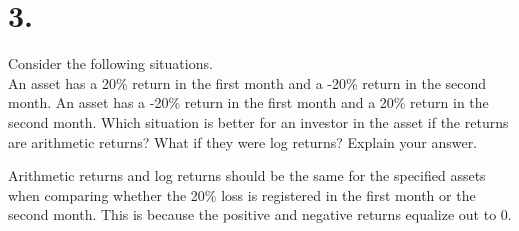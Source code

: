 \documentclass{article}
\begin{document}
\section*{3.}
{\Large 

Consider the following situations. \\
An asset has a 20\% return in the first month and a -20\% return in the second month.
An asset has a -20\% return in the first month and a 20\% return in the second month.
Which situation is better for an investor in the asset if the returns are arithmetic returns? What if they were log returns? Explain your answer.

Arithmetic returns and log returns should be the same for the specified assets when comparing whether the 20\% loss is registered in the first month or the second month. This is because the positive and negative returns equalize out to 0.
}
\end{document}
